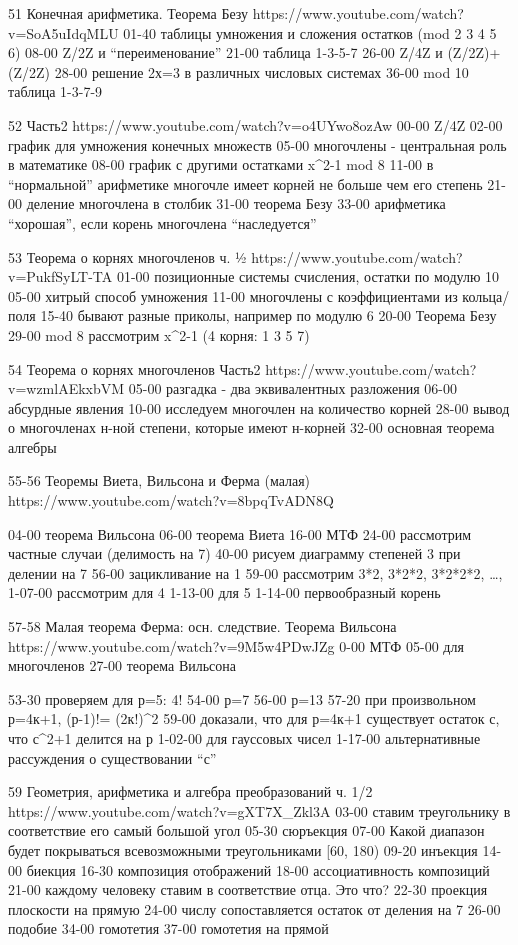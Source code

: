 51
Конечная арифметика. Теорема Безу
https://www.youtube.com/watch?v=SoA5uIdqMLU
01-40 таблицы умножения и сложения остатков (mod 2 3 4 5 6)
08-00 Z/2Z и “переименование”
21-00  таблица 1-3-5-7
26-00 Z/4Z и (Z/2Z)+(Z/2Z)
28-00 решение 2х=3 в различных числовых системах
36-00 mod 10  таблица 1-3-7-9

52
Часть2
https://www.youtube.com/watch?v=o4UYwo8ozAw
00-00 Z/4Z
02-00 график для умножения конечных множеств
05-00 многочлены - центральная роль в математике
08-00 график с другими остатками x^2-1 mod 8
11-00 в “нормальной” арифметике многочле имеет корней не больше чем его степень
21-00 деление многочлена в столбик
31-00 теорема Безу
33-00 арифметика “хорошая”, если корень многочлена “наследуется”

53
Теорема о корнях многочленов ч. ½
https://www.youtube.com/watch?v=PukfSyLT-TA
01-00 позиционные системы счисления, остатки по модулю 10
05-00 хитрый способ умножения
11-00 многочлены с коэффициентами из кольца/поля
15-40 бывают разные приколы, например по модулю 6
20-00 Теорема Безу
29-00 mod 8 рассмотрим x^2-1 (4 корня: 1 3 5 7)

54
Теорема о корнях многочленов Часть2
https://www.youtube.com/watch?v=wzmlAEkxbVM
05-00 разгадка - два эквивалентных разложения
06-00 абсурдные явления
10-00 исследуем многочлен на количество корней
28-00 вывод о многочленах н-ной степени, которые имеют н-корней
32-00 основная теорема алгебры

55-56
Теоремы Виета, Вильсона и Ферма (малая)
https://www.youtube.com/watch?v=8bpqTvADN8Q

04-00 теорема Вильсона
06-00 теорема Виета
16-00 МТФ
24-00 рассмотрим частные случаи (делимость на 7)
40-00 рисуем диаграмму степеней 3 при делении на 7
56-00 зацикливание на 1
59-00 рассмотрим 3*2, 3*2*2, 3*2*2*2, …,
1-07-00 рассмотрим для 4
1-13-00 для 5
1-14-00 первообразный корень

57-58
Малая теорема Ферма: осн. следствие. Теорема Вильсона
https://www.youtube.com/watch?v=9M5w4PDwJZg
0-00 МТФ
05-00 для многочленов
27-00 теорема Вильсона

53-30 проверяем для р=5: 4!
54-00 р=7
56-00 р=13
57-20 при произвольном р=4к+1, (р-1)!= (2к!)^2
59-00 доказали, что для р=4к+1 существует остаток с, что с^2+1 делится на р
1-02-00 для гауссовых чисел
1-17-00 альтернативные рассуждения о существовании “с”

59
Геометрия, арифметика и алгебра преобразований ч. 1/2
https://www.youtube.com/watch?v=gXT7X_Zkl3A
03-00 ставим треугольнику в соответствие его самый большой угол
05-30 сюръекция
07-00 Какой диапазон будет покрываться всевозможными треугольниками [60, 180)
09-20 инъекция
14-00 биекция
16-30 композиция отображений
18-00 ассоциативность композиций
21-00 каждому человеку ставим в соответствие отца. Это что?
22-30 проекция плоскости на прямую
24-00 числу сопоставляется остаток от деления на 7
26-00 подобие
34-00 гомотетия
37-00 гомотетия на прямой

